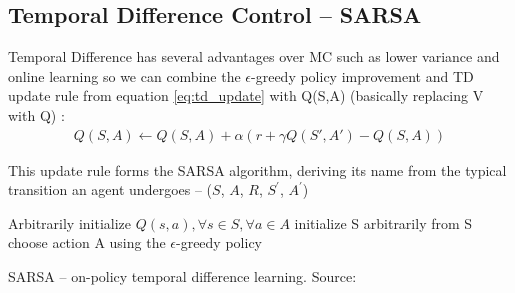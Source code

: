 

\subsection{Temporal Difference Control -- SARSA}
Temporal Difference has several advantages over MC such as lower variance and online learning so we can combine the $\epsilon$-greedy policy improvement and TD update rule from equation \ref{eq:td_update} with Q(S,A) \cite{lecture_mfc} (basically replacing V with Q) :
\begin{align}
    Q(S, A) \longleftarrow Q(S, A) + \alpha (r + \gamma Q(S', A') - Q(S, A)) \label{eq:sarsa_update_rule}
\end{align}

This update rule forms the SARSA algorithm, deriving its name
from the typical transition an agent undergoes -- 
($S$, $A$, $R$, $S^'$, $A^'$)\\

\begin{algorithm}[H]
\SetAlgoLined
Arbitrarily initialize $Q(s, a), \forall s \in S, \forall a \in A$\;
initialize S arbitrarily\;
from S choose action A using the $\epsilon$-greedy policy\;
\caption{SARSA -- on-policy temporal difference learning. Source: \cite{lecture_mfc} }
\label{algorithm:sarsa}
\end{algorithm}\\

